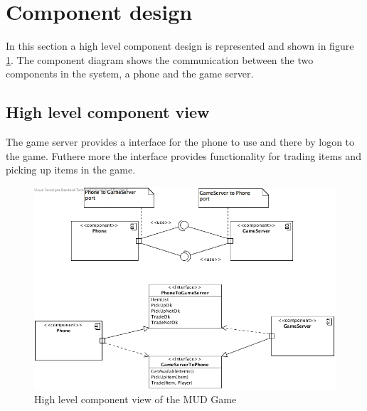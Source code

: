\section{Component design}
In this section a high level component design is represented and shown in figure \ref{fig:high-level-component}. The component diagram shows the communication between the two components in the system, a phone and the game server.


\subsection*{High level component view}
The game server provides a interface for the phone to use and there by logon to the game. Futhere more the interface provides functionality for trading items and picking up items in the game. 

\begin{figure}[!ht]
  \begin{center}
    \includegraphics[width=1\textwidth]{figures/high-level-view.jpg} 
  \end{center}
  \caption{High level component view of the MUD Game}
  \label{fig:high-level-component}
\end{figure}
